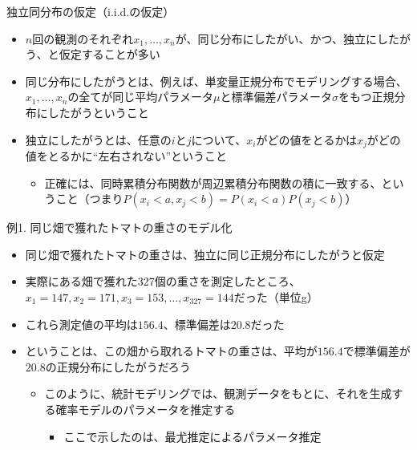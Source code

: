 \documentclass[aspectratio=169,unicode,dvipdfmx,14pt]{beamer}
\begin{document}
\begin{frame}{独立同分布の仮定（i.i.d.の仮定）}
\begin{itemize}
\item $n$回の観測のそれぞれ$x_1,\ldots,x_n$が、同じ分布にしたがい、かつ、独立にしたがう、と仮定することが多い
\item 同じ分布にしたがうとは、例えば、単変量正規分布でモデリングする場合、$x_1,\ldots,x_n$の全てが同じ平均パラメータ$\mu$と標準偏差パラメータ$\sigma$をもつ正規分布にしたがうということ
\item 独立にしたがうとは、任意の$i$と$j$について、$x_i$がどの値をとるかは$x_j$がどの値をとるかに``左右されない''ということ
\begin{itemize}
\item 正確には、同時累積分布関数が周辺累積分布関数の積に一致する、ということ（つまり$P(x_i<a,x_j<b)=P(x_i<a)P(x_j<b)$）
\end{itemize}
\end{itemize}
\end{frame}


\begin{frame}{例1. 同じ畑で獲れたトマトの重さのモデル化}
\begin{itemize}
\item 同じ畑で獲れたトマトの重さは、独立に同じ正規分布にしたがうと仮定
\item 実際にある畑で獲れた327個の重さを測定したところ、$x_1=147, x_2=171, x_3=153, \ldots, x_{327}=144$だった（単位g）
\item これら測定値の平均は$156.4$、標準偏差は$20.8$だった
\item ということは、この畑から取れるトマトの重さは、平均が$156.4$で標準偏差が$20.8$の正規分布にしたがうだろう
\begin{itemize}
\item このように、統計モデリングでは、観測データをもとに、それを生成する確率モデルのパラメータを推定する
\begin{itemize}
\item ここで示したのは、最尤推定によるパラメータ推定
\end{itemize}
\end{itemize}
\end{itemize}
\end{frame}
\end{document}
